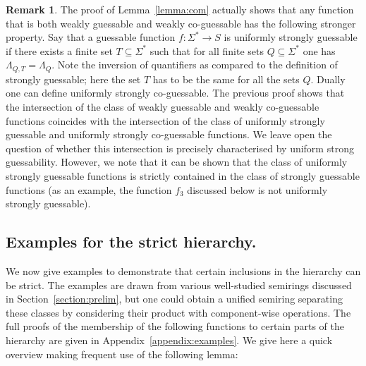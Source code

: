 \documentclass[10pt,a4paper]{amsart}
\theoremstyle{definition}
\newtheorem{rem}[thm]{Remark}
\numberwithin{equation}{section}
\numberwithin{theorem}{section}
\begin{document}
\begin{rem}
\label{rk:universalsg}
The proof of Lemma~\ref{lemma:com} actually shows that any function that is both weakly guessable and weakly co-guessable has the following stronger property. Say that a guessable function $f: \Sigma^* \rightarrow S$ is uniformly strongly guessable if there exists a finite set $T \subseteq \Sigma^*$ such that for all finite sets $Q \subseteq \Sigma^*$ one has $\Lambda_{Q,T} = \Lambda_{Q}$. Note the inversion of quantifiers as compared to the definition of strongly guessable; here the set $T$ has to be the same for all the sets $Q$. Dually one can define uniformly strongly co-guessable. The previous proof shows that the intersection of the class of weakly guessable and weakly co-guessable functions coincides with the intersection of the class of uniformly strongly guessable and uniformly strongly co-guessable functions.  We leave open the question of whether this intersection  is precisely characterised by uniform strong guessability. However, we note that it can be shown that the class of uniformly strongly guessable functions is strictly contained in the class of strongly guessable functions (as an example, the function $f_3$ discussed below is not uniformly strongly guessable).
\end{rem}

\subsection{Examples for the strict hierarchy.}
\label{subsec:strict}

We now give examples to demonstrate that certain inclusions in the hierarchy can be strict. The examples are drawn from various well-studied semirings discussed in Section~\ref{section:prelim}, but one could obtain a unified semiring separating these classes by considering their product with component-wise operations.  The full proofs of the membership of the following functions to certain parts of the hierarchy are given in Appendix~\ref{appendix:examples}. We give here a quick overview making frequent use of the following lemma:
\end{document}
